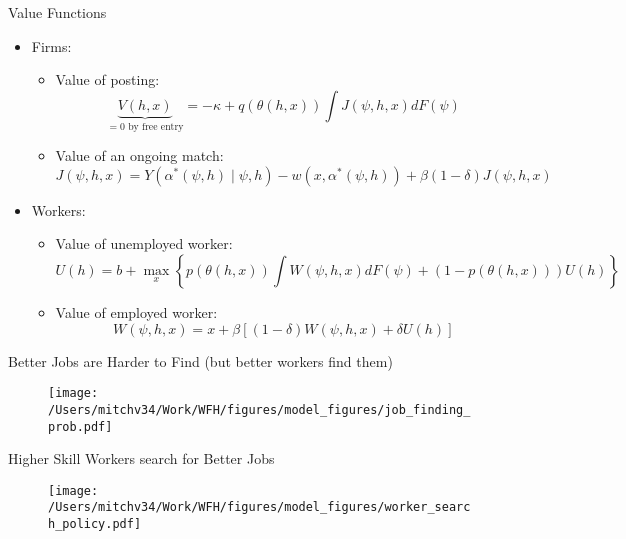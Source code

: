 \documentclass[aspectratio=1610]{beamer}
\begin{document}
\begin{frame}{Value Functions}

    \begin{itemize}
        \item Firms:
        \begin{itemize}
            \item Value of posting:
                \begin{equation*}
                    \underbrace{V(h, x)}_{=0\text{ by free entry}} = - \kappa + q(\theta(h,x))\int J(\psi, h, x) dF(\psi)
                \end{equation*}
            \item Value of an ongoing match:
            \begin{equation*}
                    J(\psi, h, x) = Y(\alpha^*(\psi, h)\mid \psi, h) - w(x, \alpha^*(\psi, h)) + \beta (1 - \delta) J(\psi, h, x)
                \end{equation*}
        \end{itemize}
        \item Workers:
        \begin{itemize}
            \item Value of unemployed worker:
            \begin{equation*}
 U(h) = b + \max_{x}\left\{ p(\theta(h,x))\int W(\psi, h, x) dF(\psi) + (1 - p(\theta(h,x)))U(h)\right\}
            \end{equation*}
            \item Value of employed worker:
            \begin{equation*}
 W(\psi, h, x) = x + \beta \left[ (1 - \delta) W(\psi, h, x) + \delta U(h) \right]
            \end{equation*}
        \end{itemize}
    \end{itemize}
    
\end{frame}

\begin{frame}{Better Jobs are Harder to Find (but better workers find them)}
    \begin{figure}
        \centering
        \texttt{[image: /Users/mitchv34/Work/WFH/figures/model\_figures/job\_finding\_prob.pdf]}
    \end{figure}
\end{frame}

\begin{frame}{Higher Skill Workers search for Better Jobs}
    \begin{figure}
        \centering
        \texttt{[image: /Users/mitchv34/Work/WFH/figures/model\_figures/worker\_search\_policy.pdf]}
    \end{figure}
\end{frame}
\end{document}
